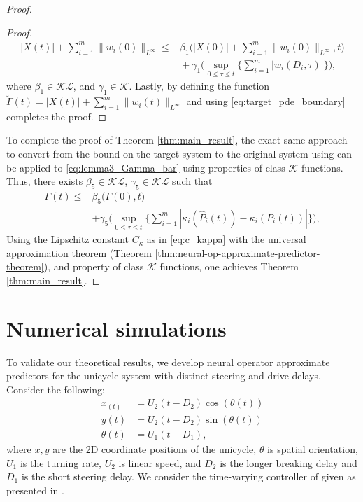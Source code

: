 \documentclass[letterpaper, 10 pt, conference]{ieeeconf}  %
\begin{document}
\begin{proof}
\begin{proof}
\begin{align}
    |X(t)|\nonumber  + \sum_{i=1}^m \|w_i(0)\|_{L^\infty} \leq& \beta_1 \bigg( |X(0)| + \sum_{i=1}^m \|w_i(0)\|_{L^\infty}, t \bigg) \nonumber \\&\!\!\!+ \gamma_1 \bigg( \sup_{0 \leq \tau \leq t} \bigg\{ \sum_{i=1}^m |w_i(D_i,\tau)| \bigg\} \bigg), \label{eq:x_and_w_after_c4}
\end{align}
where $\beta_1 \in \mathcal{KL}$, and $\gamma_1 \in \mathcal{K}$. Lastly, by defining the function $\breve{\Gamma}(t) = |X(t)| + \sum_{i=1}^m \|w_i(t)\|_{L^\infty}$ and using \eqref{eq:target_pde_boundary} completes the proof.
\end{proof}

To complete the proof of Theorem \ref{thm:main_result}, the exact same approach to convert from the bound on the target system to the original system using \cite[Lemmas 4, 5, 6]{Bekiaris-Liberis_Krstic:2016} can be applied to \eqref{eq:lemma3_Gamma_bar} using properties of class $\mathcal{K}$ functions. Thus, there exists $\beta_5 \in \mathcal{KL}$, $\gamma_5 \in \mathcal{KL}$ such that
\begin{align}
    \Gamma(t) \leq& \beta_5 \bigg( \Gamma(0), t \bigg) \nonumber  \\ & + \gamma_5 \bigg( \sup_{0 \leq \tau \leq t} \bigg\{ \sum_{i=1}^m |\kappa_i(\hat{P}_i(t)) - \kappa_i(P_i(t))| \bigg\} \bigg), \label{eq:original-system-bound}
\end{align}
Using the Lipschitz constant $C_\kappa$ as in \eqref{eq:c_kappa} with the universal approximation theorem (Theorem \ref{thm:neural-op-approximate-predictor-theorem}), and property of class $\mathcal{K}$ functions, one achieves Theorem \ref{thm:main_result}. 
\end{proof}


\section{Numerical simulations} \label{sec:numerical}
To validate our theoretical results, we develop neural operator approximate predictors for the unicycle system with distinct steering and drive delays. Consider the following: 
\begin{subequations}
\begin{align}
    x_(t) &= U_2(t-D_2)\cos(\theta(t)) \label{eq:unicycle_x1_dot} \\
    y(t) &= U_2(t-D_2)\sin(\theta(t)) \label{eq:unicycle_x2_dot} \\
    \theta(t) &= U_1(t-D_1), \label{eq:unicycle_x3_dot}
\end{align}
\end{subequations}
where $x, y$ are the 2D coordinate positions of the unicycle, $\theta$ is spatial orientation, $U_1$ is the turning rate, $U_2$ is linear speed, and $D_2$ is the longer breaking delay and $D_1$ is the short steering delay. We consider the time-varying controller of \cite{POMET1992147} given as presented in \cite[Section V]{Bekiaris-Liberis_Krstic:2016}.
\end{document}
